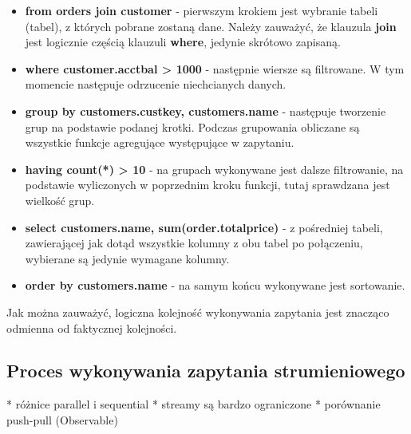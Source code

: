 \documentclass[12pt]{extarticle}
\begin{document}
\begin{itemize}
    \item \textbf{from orders join customer} - pierwszym krokiem jest wybranie tabeli (tabel), z których pobrane zostaną dane. Należy zauważyć, że klauzula \textbf{join} jest logicznie częścią klauzuli \textbf{where}, jedynie skrótowo zapisaną.
    \item \textbf{where customer.acctbal > 1000} - następnie wiersze są filtrowane. W tym momencie następuje odrzucenie niechcianych danych. 
    \item \textbf{group by customers.custkey, customers.name} - następuje tworzenie grup na podstawie podanej krotki. Podczas grupowania obliczane są wszystkie funkcje agregujące występujące w zapytaniu.
    \item \textbf{having count(*) > 10} - na grupach wykonywane jest dalsze filtrowanie, na podstawie wyliczonych w poprzednim kroku funkcji, tutaj sprawdzana jest wielkość grup.
    \item \textbf{select customers.name, sum(order.totalprice)} - z pośredniej tabeli, zawierającej jak dotąd wszystkie kolumny z obu tabel po połączeniu, wybierane są jedynie wymagane kolumny.
    \item \textbf{order by customers.name} - na samym końcu wykonywane jest sortowanie.
\end{itemize}

Jak można zauważyć, logiczna kolejność wykonywania zapytania jest znacząco odmienna od faktycznej kolejności.

\subsection{Proces wykonywania zapytania strumieniowego}

* różnice parallel i sequential
* streamy są bardzo ograniczone
* porównanie push-pull (Observable)
\end{document}
